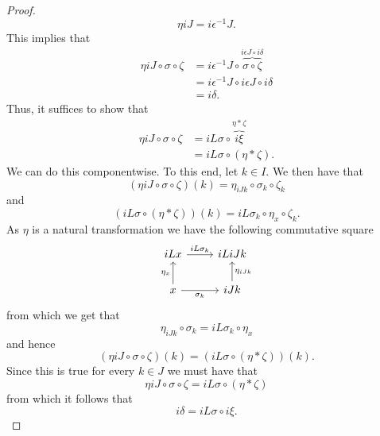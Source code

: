 \begin{proof}
\begin{equation}
    \eta iJ = i \epsilon^{-1} J.
  \end{equation}
  This implies that
  \begin{align*}
    \eta iJ \circ \sigma \circ \zeta &= i \epsilon^{-1}J \circ \overbrace{\sigma \circ \zeta}^{i\epsilon J \circ i\delta} \\
                                     &= i\epsilon^{-1}J \circ i\epsilon J \circ i\delta \\
                                     &= i \delta.
  \end{align*}
  Thus, it suffices to show that
  \begin{align*}
    \eta iJ \circ \sigma \circ \zeta &= iL\sigma \circ \overbrace{i\xi}^{\eta * \zeta} \\
                                     &= iL\sigma \circ (\eta * \zeta)
  .\end{align*}
  We can do this componentwise. To this end, let $ k \in I $. We then have that
  \begin{equation}
    (\eta iJ \circ \sigma \circ \zeta)(k) = \eta_{iJk} \circ \sigma_k \circ \zeta_k
  \end{equation}
  and
  \begin{equation}
    (iL\sigma \circ (\eta * \zeta))(k) = iL\sigma_k \circ \eta_x \circ \zeta_k.
  \end{equation}
  As $ \eta $ is a natural transformation we have the following commutative square
  \[\begin{tikzcd}
	  iLx & iLiJk \\
	  x & iJk
	  \arrow["{\sigma_k}"', from=2-1, to=2-2]
	  \arrow["{\eta_x}", from=2-1, to=1-1]
	  \arrow["{\eta_{iJk}}"', from=2-2, to=1-2]
	  \arrow["{iL\sigma_k}", from=1-1, to=1-2]
  \end{tikzcd}\]
  from which we get that
  \begin{equation}
    \eta_{iJk} \circ \sigma_k = iL\sigma_k \circ \eta_x
  \end{equation}
  and hence
  \begin{equation}
    (\eta iJ \circ \sigma \circ \zeta)(k) = (iL\sigma \circ (\eta * \zeta))(k).
  \end{equation}
  Since this is true for every $ k \in J $ we must have that
  \begin{equation}
    \eta iJ \circ \sigma \circ \zeta = iL\sigma \circ (\eta * \zeta)
  \end{equation}
  from which it follows that
  \begin{equation}
    i\delta = iL\sigma \circ i\xi.

\end{equation}
\end{proof}
